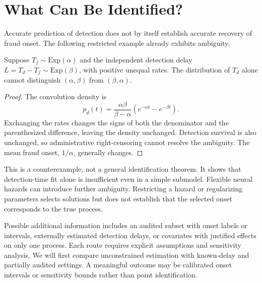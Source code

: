 \section{What Can Be Identified?}
Accurate prediction of detection does not by itself establish accurate
recovery of fraud onset. The following restricted example already exhibits
ambiguity.

\begin{proposition}
Suppose $T_f\sim\mathrm{Exp}(\alpha)$ and the independent detection delay
$L=T_d-T_f\sim\mathrm{Exp}(\beta)$, with positive unequal rates. The
distribution of $T_d$ alone cannot distinguish $(\alpha,\beta)$ from
$(\beta,\alpha)$.
\end{proposition}
\begin{proof}
The convolution density is
\begin{equation}
 p_d(t)=\frac{\alpha\beta}{\beta-\alpha}
       \left(e^{-\alpha t}-e^{-\beta t}\right).
\end{equation}
Exchanging the rates changes the signs of both the denominator and the
parenthesized difference, leaving the density unchanged. Detection survival
is also unchanged, so administrative right-censoring cannot resolve the
ambiguity. The mean fraud onset, $1/\alpha$, generally changes.
\end{proof}

This is a counterexample, not a general identification theorem. It shows
that detection-time fit alone is insufficient even in a simple submodel.
Flexible neural hazards can introduce further ambiguity. Restricting a
hazard or regularizing parameters selects solutions but does not establish
that the selected onset corresponds to the true process.

Possible additional information includes an audited subset with onset labels
or intervals, externally estimated detection delays, or covariates with
justified effects on only one process. Each route requires explicit
assumptions and sensitivity analysis. We will first compare unconstrained
estimation with known-delay and partially audited settings. A meaningful
outcome may be calibrated onset intervals or sensitivity bounds rather than
point identification.

